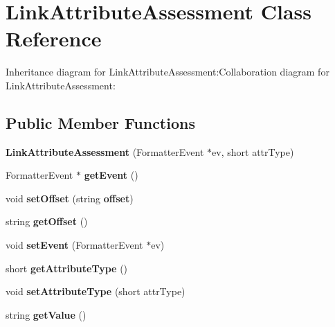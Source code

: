 \section{LinkAttributeAssessment Class Reference}
\label{classbr_1_1pucrio_1_1telemidia_1_1ginga_1_1ncl_1_1model_1_1link_1_1LinkAttributeAssessment}
Inheritance diagram for LinkAttributeAssessment:Collaboration diagram for LinkAttributeAssessment:\subsection*{Public Member Functions}
\begin{CompactItemize}
\item 
\textbf{LinkAttributeAssessment} (FormatterEvent $\ast$ev, short attrType)\label{classbr_1_1pucrio_1_1telemidia_1_1ginga_1_1ncl_1_1model_1_1link_1_1LinkAttributeAssessment_87492e4ec655787326497b4aae7d7783}

\item 
FormatterEvent $\ast$ \textbf{getEvent} ()\label{classbr_1_1pucrio_1_1telemidia_1_1ginga_1_1ncl_1_1model_1_1link_1_1LinkAttributeAssessment_3efa52713f97472630a2e5507559830d}

\item 
void \textbf{setOffset} (string {\bf offset})\label{classbr_1_1pucrio_1_1telemidia_1_1ginga_1_1ncl_1_1model_1_1link_1_1LinkAttributeAssessment_c271a7e237a607e330456abb5dd7a1e5}

\item 
string \textbf{getOffset} ()\label{classbr_1_1pucrio_1_1telemidia_1_1ginga_1_1ncl_1_1model_1_1link_1_1LinkAttributeAssessment_578757d9effa858f65d396284e7f4aae}

\item 
void \textbf{setEvent} (FormatterEvent $\ast$ev)\label{classbr_1_1pucrio_1_1telemidia_1_1ginga_1_1ncl_1_1model_1_1link_1_1LinkAttributeAssessment_ea66e0672dfa9400ad2e4a596631f920}

\item 
short \textbf{getAttributeType} ()\label{classbr_1_1pucrio_1_1telemidia_1_1ginga_1_1ncl_1_1model_1_1link_1_1LinkAttributeAssessment_77bda251d138b638444c570e13ef2dfd}

\item 
void \textbf{setAttributeType} (short attrType)\label{classbr_1_1pucrio_1_1telemidia_1_1ginga_1_1ncl_1_1model_1_1link_1_1LinkAttributeAssessment_a66c964be17dc95237352be2b4eab89f}

\item 
string \textbf{getValue} ()\label{classbr_1_1pucrio_1_1telemidia_1_1ginga_1_1ncl_1_1model_1_1link_1_1LinkAttributeAssessment_650fbea5b6e5402aba339bf785cf3cc4}

\end{CompactItemize}
